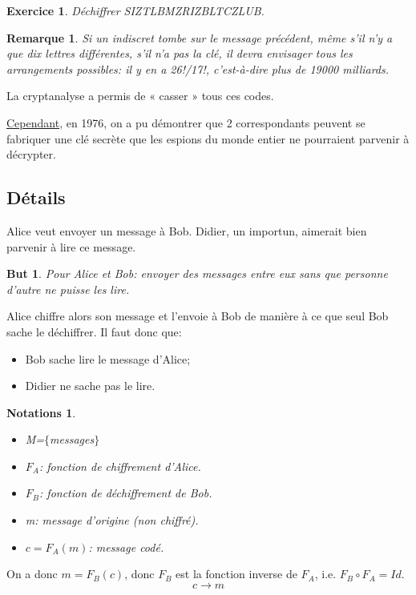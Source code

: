 \documentclass[12pt]{report}
\newtheorem*{exo}{Exercice}
\newtheorem*{rem}{Remarque}
\newtheorem*{but}{But}
\newtheorem*{notas}{Notations}
\begin{document}
\begin{exo}
Déchiffrer SIZTLBMZRIZBLTCZLUB.
\end{exo}  
  
\begin{rem}
Si un indiscret tombe sur le message précédent, même s'il n'y a que dix lettres différentes, s'il n'a pas la clé, il devra envisager tous les arrangements possibles: il y en a 26!/17!, c'est-à-dire plus de 19000 milliards.
\end{rem}  

La cryptanalyse a permis de « casser » tous ces codes.

\underline{Cependant}, en 1976, on a pu démontrer que 2 correspondants peuvent se fabriquer une clé secrète que les espions du monde entier ne pourraient parvenir à décrypter.

\subsection*{Détails}


Alice veut envoyer un message à Bob. Didier, un importun, aimerait bien parvenir à lire ce message.

\begin{but}
Pour Alice et Bob: envoyer des messages entre eux sans que personne d'autre ne puisse les lire.
\end{but}

Alice chiffre alors son message et l'envoie à Bob de manière à ce que seul Bob sache le déchiffrer. Il faut donc que:
\begin{itemize}
\item[•] Bob sache lire le message d'Alice;
\item[•] Didier ne sache pas le lire.
\end{itemize}

\begin{notas}\
\begin{itemize}
\item[•] M=$\{$messages$\}$
\item[•] $F_A$: fonction de chiffrement d'Alice.
\item[•] $F_B$: fonction de déchiffrement de Bob.
\item[•] m: message d'origine (non chiffré).
\item[•] $c=F_A(m)$: message codé.
\end{itemize}
\end{notas}

On a donc $m=F_B(c)$, donc $F_B$ est la fonction inverse de $F_A$, i.e. $F_B \circ F_A =Id$.
$$      c \longrightarrow m      $$
\end{document}
